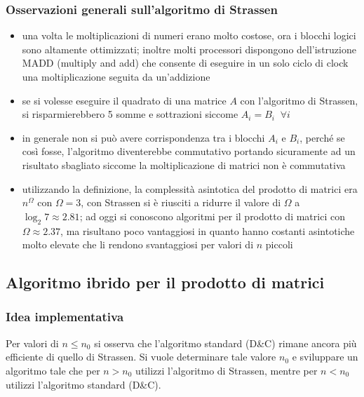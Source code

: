 \subsubsection*{Osservazioni generali sull'algoritmo di Strassen}
\begin{itemize}
	\item una volta le moltiplicazioni di numeri erano molto costose, ora i blocchi logici sono altamente ottimizzati; inoltre
	molti processori dispongono dell'istruzione MADD (multiply and add) che consente di eseguire in un solo ciclo di clock
	una moltiplicazione seguita da un'addizione
	\item se si volesse eseguire il quadrato di una matrice \(A\) con l'algoritmo di Strassen, si risparmierebbero 5 somme
	e sottrazioni siccome \(A_i = B_i \;\; \forall i\)
	\item in generale non si può avere corrispondenza tra i blocchi \(A_i\) e \(B_i\), perché se così fosse, l'algoritmo
	diventerebbe commutativo portando sicuramente ad un risultato sbagliato siccome la moltiplicazione di matrici non è
	commutativa
	\item utilizzando la definizione, la complessità asintotica del prodotto di matrici era \(n^\Omega\) con \(\Omega = 3\),
	con Strassen si è riusciti a ridurre il valore di \(\Omega\) a \(\log_2 7 \approx 2.81\); ad oggi si conoscono algoritmi
	per il prodotto di matrici con \(\Omega \approx 2.37\), ma risultano poco vantaggiosi in quanto hanno costanti asintotiche
	molto elevate che li rendono svantaggiosi per valori di \(n\) piccoli
\end{itemize}

\subsection{Algoritmo ibrido per il prodotto di matrici}
\subsubsection*{Idea implementativa}
Per valori di \(n \leq n_0\) si osserva che l'algoritmo standard (D\&C) rimane ancora più efficiente di quello di Strassen.
Si vuole determinare tale valore \(n_0\) e sviluppare un algoritmo tale che per \(n > n_0\) utilizzi l'algoritmo di Strassen, 
mentre per \(n < n_0\) utilizzi l'algoritmo standard (D\&C).

